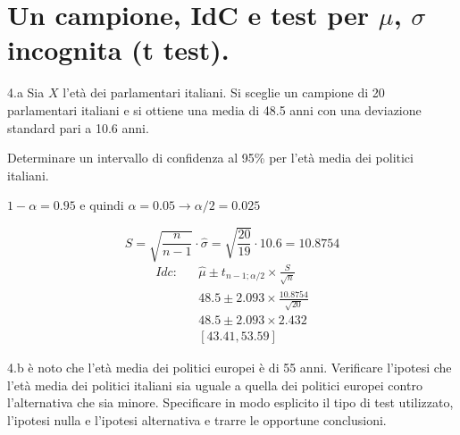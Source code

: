 \documentclass[
  11pt,
]{book}
\theoremstyle{mytheoremstyle}
\theoremstyle{mydefstyle}
\newenvironment{sol}
  {
  \begin{tcolorbox}[enhanced,breakable,arc=0.1mm,boxrule=1pt,colback=white,colframe=iblue,
  title=\bf \fontfamily{lmss}\selectfont \hspace{.5 cm} Soluzione,drop fuzzy shadow]

}{
\end{tcolorbox}
  }
\begin{document}
\section{\texorpdfstring{Un campione, IdC e test per \(\mu\), \(\sigma\) incognita (t test).}{Un campione, IdC e test per \textbackslash mu, \textbackslash sigma incognita (t test).}}\label{un-campione-idc-e-test-per-mu-sigma-incognita-t-test.}

4.a Sia \(X\) l'età dei parlamentari italiani.
Si sceglie un campione di 20 parlamentari italiani e si ottiene una
media di 48.5 anni con una deviazione standard pari a 10.6 anni.

Determinare un intervallo di confidenza al 95\% per
l'età media dei politici italiani.

\begin{sol}
\(1-\alpha =0.95\) e quindi \(\alpha=0.05\rightarrow \alpha/2=0.025\)

\[
      S  =\sqrt{\frac {n}{n-1}}\cdot\hat\sigma =
     \sqrt{\frac { 20 }{ 19 }}\cdot 10.6 = 10.8754 
\]
\begin{eqnarray*}
  Idc: & &  \hat\mu \pm  t_{n-1;\alpha/2} \times \frac{S}{\sqrt{n}} \\
     & &  48.5 \pm  2.093 \times \frac{ 10.8754 }{\sqrt{ 20 }} \\
     & &  48.5 \pm  2.093 \times  2.432 \\
     & & [ 43.41 ,  53.59 ]
\end{eqnarray*}

\end{sol}

4.b è noto che l'età media dei politici europei
è di 55 anni.
Verificare l'ipotesi
che l'età media dei politici italiani sia uguale a quella
dei politici europei contro l'alternativa che sia minore.
Specificare in modo esplicito il tipo di test utilizzato,
l'ipotesi nulla e l'ipotesi alternativa e trarre le opportune
conclusioni.
\end{document}
